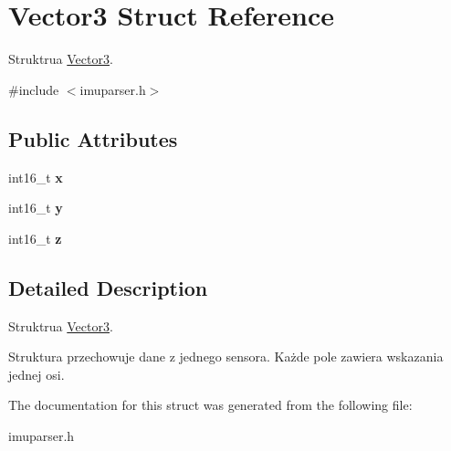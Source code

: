 \hypertarget{struct_vector3}{}\section{Vector3 Struct Reference}
\label{struct_vector3}


Struktrua \mbox{\hyperlink{struct_vector3}{Vector3}}.  




{\ttfamily \#include $<$imuparser.\+h$>$}

\subsection*{Public Attributes}
\begin{DoxyCompactItemize}
\item 
\mbox{\label{struct_vector3_a26698e47e12014072fd0fc212e15fa6a}} 
int16\+\_\+t {\bfseries x}
\item 
\mbox{\label{struct_vector3_ae5fcf4c9f64e4d64bd9b657c02c29eb6}} 
int16\+\_\+t {\bfseries y}
\item 
\mbox{\label{struct_vector3_ac030b81b9846a70caaeb29b5f40c832f}} 
int16\+\_\+t {\bfseries z}
\end{DoxyCompactItemize}


\subsection{Detailed Description}
Struktrua \mbox{\hyperlink{struct_vector3}{Vector3}}. 

Struktura przechowuje dane z jednego sensora. Każde pole zawiera wskazania jednej osi. 

The documentation for this struct was generated from the following file\+:\begin{DoxyCompactItemize}
\item 
imuparser.\+h\end{DoxyCompactItemize}
